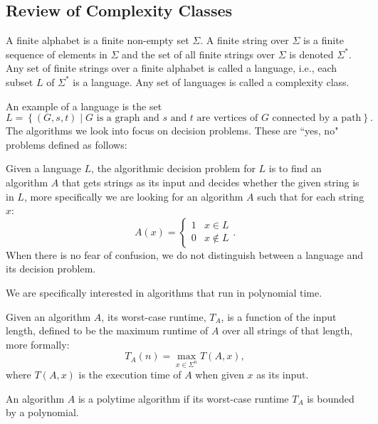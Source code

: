 
\subsection{Review of Complexity Classes}

\begin{definition}

A finite alphabet is a finite non-empty set $\Sigma$. A finite string over $\Sigma$ is a finite sequence of elements in $\Sigma$ and the set of all finite strings over $\Sigma$ is denoted $\Sigma^*$. Any set of finite strings over a finite alphabet is called a language, i.e., each subset $L$ of $\Sigma^*$ is a language. Any set of languages is called a complexity class.
\end{definition}

An example of a language is the set
\[L = \left\{ (G, s, t) \mid G \text{ is a graph and } s \text{ and } t \text{ are vertices of } G \text{ connected by a path}  \right\}.\]
The algorithms we look into focus on decision problems. These are ``yes, no" problems defined as follows:
\begin{definition}
Given a language $L$, the algorithmic decision problem for $L$ is to find an algorithm $A$ that gets strings as its input and decides whether the given string is in $L$, more specifically we are looking for an algorithm $A$ such that for each string $x$:
$$A(x) = \left\{\begin{matrix}
1 & x \in L\\ 
0 & x \not \in L 
\end{matrix}\right..$$
When there is no fear of confusion, we do not distinguish between a language and its decision problem.
\end{definition}

We are specifically interested in algorithms that run in polynomial time.

\begin{definition}
Given an algorithm $A$, its worst-case runtime, $T_A$, is a function of the input length, defined to be the maximum runtime of $A$ over all strings of that length, more formally:
$$T_A(n) = \max_{x \in \Sigma^{n}} T(A, x),$$ where $T(A,x)$ is the execution time of $A$ when given $x$ as its input.
\end{definition}

\begin{definition}
An algorithm $A$ is a polytime algorithm if its worst-case runtime $T_A$ is bounded by a polynomial.
\end{definition}

